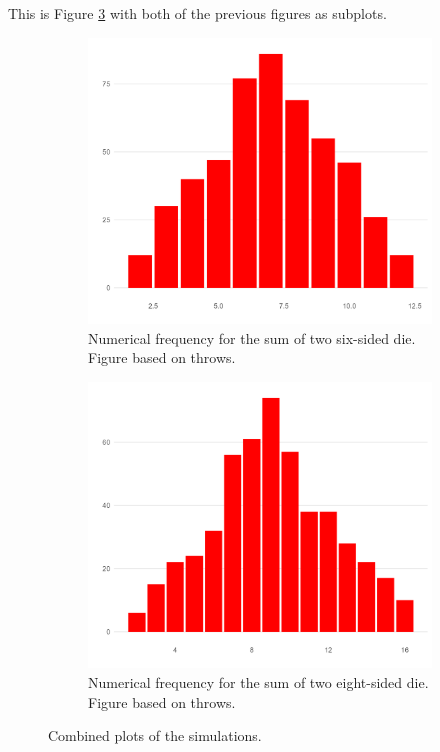 \documentclass[12pt]{article}
\theoremstyle{definition}
\begin{document}
This is Figure \ref{fig:figsubplots} with both of the previous figures as subplots.
\begin{figure}[tbh!]
\begin{subfigure}{.4\textwidth}
  \centering
  \includegraphics[width=.8\linewidth]{plot/baseline/hist_red.png}  
  \caption{Numerical frequency for the sum of two six-sided die. Figure based on throws.}
  \label{fig:sub-first}
\end{subfigure}
\begin{subfigure}{.4\textwidth}
  \centering
  \includegraphics[width=.8\linewidth]{plot/500_8/hist_red.png}  
  \caption{Numerical frequency for the sum of two eight-sided die. Figure based on throws.}
  \label{fig:sub-second}
\end{subfigure}
\caption{Combined plots of the simulations.}
\label{fig:figsubplots}
\end{figure}
\end{document}
